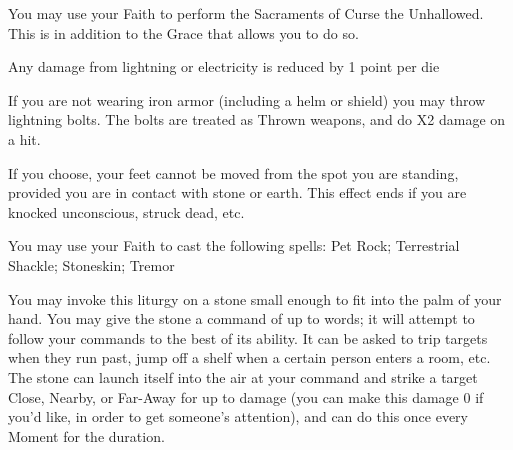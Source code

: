 {

You may use your Faith to perform the Sacraments of Curse the Unhallowed.  This is in addition to the Grace that allows you to do so.




\GOD[
Name=Raiden,
Link=small-god-raiden,
GodOf=Lord of Lightning,
Holy=two iron bracers with lightning bolts etched on them
]


Any damage from lightning or electricity is reduced by 1 point per die


If you are not wearing iron armor (including a helm or shield) you may throw lightning bolts.  The bolts are treated as Thrown weapons, and do \DICE X2 damage on a hit.




\GOD[
Name=Raimonds Mountainhand,
Link=small-god-raimonds mountainhand,
GodOf=Seraph of the Mountaintops,
Holy=3 iron spikes in the shape of icicles or teeth hung from the neck
]


If you choose, your feet cannot be moved from the spot you are standing, provided you are in contact with stone or earth. This effect ends if you are knocked unconscious, struck dead, etc.


You may use your Faith to cast the following spells: Pet Rock; Terrestrial Shackle; Stoneskin; Tremor

\LITURGY [
  Name= Pet Rock,
  Link= raimonds-liturgy-pet-rock,
  Paradigm= Elements ,
  Save=  N ,
  Duration= Combat or \SUMDICE Minutes ,
  Counter=  n/a  ,
  Keywords= None ,
  Target=   Close (touch) Stone
]



You may invoke this liturgy on a stone small enough to fit into the palm of your hand.  You may give the stone a command of up to \DICE words; it will attempt to follow your commands to the best of its ability.  It can be asked to trip targets when they run past, jump off a shelf when a certain person enters a room, etc.  The stone can launch itself into the air at your command and strike a target Close, Nearby, or Far-Away for up to \DICE damage (you can make this damage 0 if you'd like, in order to get someone's attention), and can do this once every Moment for the duration.

\LITURGY [
  Name= Stoneskin,
  Link=raimonds-liturgy-stoneskin,
  Paradigm= Biomancy ,
  Save=  Y (negates) ,
  Duration= Combat or \SUMDICE Minutes ,
  Counter=  n/a  ,
  Keywords= None ,
  Target=   Self or Close creature
]



}
